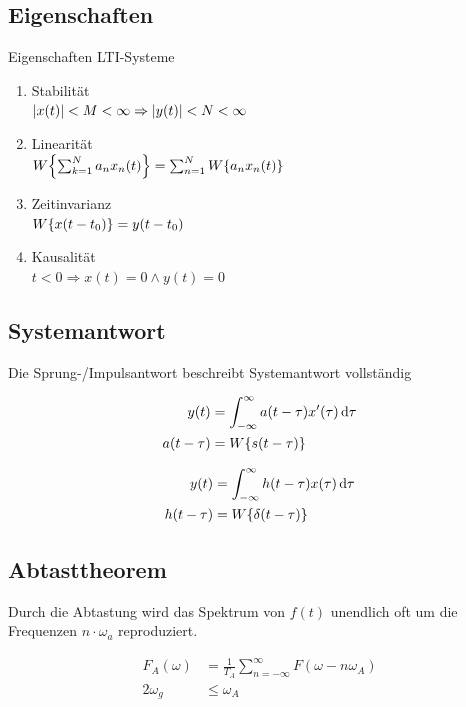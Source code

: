 \documentclass[10pt,a4paper]{article}
\begin{document}
  \subsection{Eigenschaften}
  Eigenschaften LTI-Systeme
  \begin{mdframed}[style=exercise]
    \begin{enumerate}
      \item Stabilität\\
      $\abs{x(t)} < M < \infty \Rightarrow \abs{y(t)} < N < \infty$
      \item Linearität\\
      $W\qty{\sum_{k=1}^{N}a_n x_n(t)}=\sum_{n=1}^{N}W\qty{a_n x_n(t)}$
      \item Zeitinvarianz\\
      $W\qty{x(t-t_0)} =y(t-t_0)$
      \item Kausalität\\
      $t < 0 \Rightarrow x(t)=0 \land y(t)=0$
    \end{enumerate}
  \end{mdframed}
  \subsection{Systemantwort}
  Die Sprung-/Impulsantwort beschreibt Systemantwort vollständig
  \begin{mdframed}[style=exercise]
    \begin{align}
      y(t) &= \int^{\infty}_{-\infty} a(t-\tau) x'(\tau) \dd{\tau}\\
      a(t-\tau) &= W\qty{s(t-\tau)}\nonumber
    \end{align}
  \end{mdframed}
  \begin{mdframed}[style=exercise]
    \begin{align}
      y(t) &= \int_{-\infty}^{\infty} h(t-\tau) x(\tau) \dd{\tau}\\
      h(t-\tau) &= W\qty{\delta(t-\tau)}\nonumber
    \end{align}
  \end{mdframed}
  \subsection{Abtasttheorem}
  Durch die Abtastung wird das Spektrum von $f(t)$ unendlich oft um die Frequenzen $n\cdot \omega_a$ reproduziert.
  \begin{mdframed}[style=exercise]
    \begin{align}
      F_A(\omega) &= \frac{1}{T_A} \sum_{n=-\infty}^{\infty} F(\omega-n\omega_A)\\
      2\omega_g &\leq \omega_A\nonumber
    \end{align}
  \end{mdframed}
\end{document}
